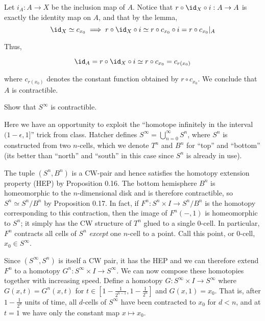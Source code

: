 \begin{homework}[e]
\begin{prf}
		Let $i_A : A \rightarrow X$ be the inclusion map of $A$. Notice that $r \circ \id_X \circ i : A \rightarrow A$ is exactly the identity map on $A$, and that by the lemma, 
		\begin{equation*}
		\id_X \simeq c_{x_0} \implies
		r \circ \id_X \circ i \simeq r \circ c_{x_0} \circ i = r \circ c_{x_0}|_A
		\end{equation*}

		Thus, 

		\begin{equation*}
		  \id_A = r \circ \id_X \circ i \simeq r \circ c_{x_0} = c_{r(x_0)}
		\end{equation*}

		where $c_{r(x_0)}$ denotes the constant function obtained by $r \circ c_{x_0}$. We conclude that $A$ is contractible.
	\end{prf}
	\newpage
	 Show that $S^\infty$ is contractible.
	\begin{prf}
		Here we have an opportunity to exploit the ``homotope infinitely in the interval $(1-\epsilon,1]$'' trick from class. Hatcher defines $S^\infty = \bigcup^\infty_{n=0} S^n$, where $S^n$ is constructed from two $n$-cells, which we denote $T^n$ and $B^n$ for ``top'' and ``bottom'' (its better than ``north'' and ``south'' in this case since $S^n$ is already in use).

		The tuple $(S^n, B^n)$ is a CW-pair and hence satisfies the homotopy extension property (HEP) by Proposition 0.16. The bottom hemisphere $B^n$ is homeomorphic to the $n$-dimensional disk and is therefore contractible, so $S^n \simeq S^n/B^n$ by Proposition 0.17. In fact, if $F^n:S^n \times I\to S^n/B^n$ is the homotopy corresponding to this contraction, then the image of $F^n(-,1)$ is homeomorphic to $S^n$; it simply has the CW structure of $T^n$ glued to a single 0-cell. In particular, $F^n$ contracts all cells of $S^n$ \emph{except} one $n$-cell to a point. Call this point, or 0-cell, $x_0 \in S^\infty$.

		Since $(S^\infty, S^n)$ is itself a CW pair, it has the HEP and we can therefore extend $F^n$ to a homotopy $G^n:S^\infty \times I \to S^\infty$. We can now compose these homotopies together with increasing speed. Define a homotopy $G:S^\infty \times I\to S^\infty$ where $G(x,t) = G^n(x,t)$ for $t \in \left[1-\frac{1}{2^{n-1}}, 1-\frac{1}{2^n}\right]$ and $G(x,1) = x_0$. That is, after $1-\frac{1}{2^{n}}$ units of time, all $d$-cells of $S^\infty$ have been contracted to $x_0$ for $d < n$, and at $t=1$ we have only the constant map $x \mapsto x_0$.


\end{prf}
\end{homework}
